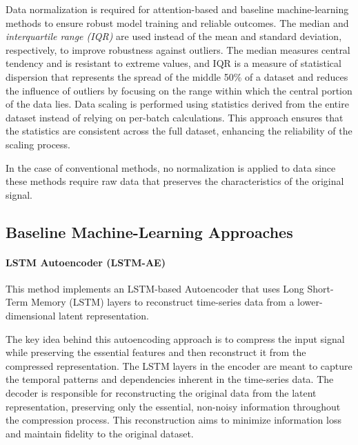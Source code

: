 \documentclass[conference]{IEEEtran}
\begin{document}
Data normalization is required for attention-based and baseline machine-learning methods to ensure robust model training and reliable outcomes. The median and \emph{interquartile range (IQR)} are used instead of the mean and standard deviation, respectively, to improve robustness against outliers. The median measures central tendency and is resistant to extreme values,
and IQR is a measure of statistical dispersion that represents the spread of the middle 50\% of a dataset and reduces the influence of outliers by focusing on the range within which the central portion of the data lies. Data scaling is performed using statistics derived from the entire dataset instead of relying on per-batch calculations. This approach ensures that the statistics are consistent across the full dataset, enhancing the reliability of the scaling process. 



In the case of conventional methods, no normalization is applied to data since these methods require raw data that preserves the characteristics of the original signal.


\subsection{Baseline Machine-Learning Approaches}

\paragraph{LSTM Autoencoder (LSTM-AE)}
This method implements an LSTM-based Autoencoder that uses Long Short-Term Memory (LSTM) layers to reconstruct time-series data from a lower-dimensional latent representation. 

The key idea behind this autoencoding approach is to compress the input signal while preserving the essential features and then reconstruct it from the compressed representation. The LSTM layers in the encoder are meant to capture the temporal patterns and dependencies inherent in the time-series data. 
The decoder is responsible for reconstructing the original data from the latent representation, preserving only the essential, non-noisy information throughout the compression process. This reconstruction aims to minimize information loss and maintain fidelity to the original dataset. 
\end{document}

